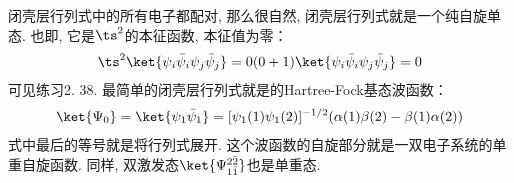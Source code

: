 闭壳层行列式中的所有电子都配对, 
那么很自然, 
闭壳层行列式就是一个纯自旋单态. 
也即, 
它是$\ts^2$的本征函数, 
本征值为零：
\begin{align}
\ts^2\ket{\psi_i\bar{\psi}_i\psi_j\bar{\psi}_j} = 0(0+1)\ket{\psi_i\bar{\psi}_i\psi_j\bar{\psi}_j} = 0
\end{align}
可见练习2.
38. 
最简单的闭壳层行列式就是的Hartree-Fock基态波函数：
\begin{align}
\ket{\Psi_0} = \ket{\psi_1\bar{\psi}_1} = [\psi_1(1)\psi_1(2)]^{-1/2}(\alpha(1)\beta(2) - \beta(1)\alpha(2))
\end{align}
式中最后的等号就是将行列式展开. 
这个波函数的自旋部分就是一双电子系统的单重自旋函数. 
同样, 
双激发态$\ket{\Psi_{1\bar{1}}^{2\bar{2}}}$也是单重态.


